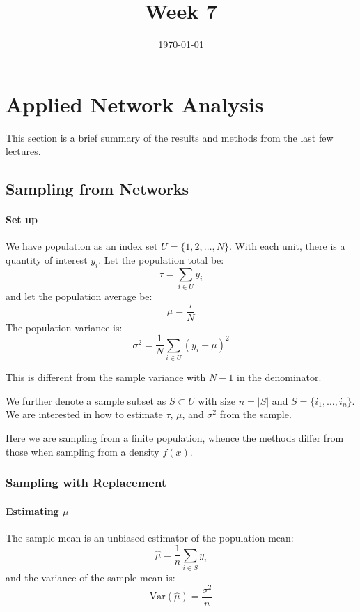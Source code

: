 \documentclass{article}
\title{Week 7}
\date{\today}
\begin{document}
\maketitle
\section{Applied Network Analysis}
This section is a brief summary of the results and methods from the last few lectures.

\subsection{Sampling from Networks}
\paragraph{Set up} We have population as an index set $U=\{1,2,\ldots, N\}$. With each unit, there is a quantity of interest $y_i$. Let the population total be:
\begin{equation}
    \tau = \sum_{i\in U} y_i
\end{equation}
and let the population average be:
\begin{equation}
    \mu = \frac{\tau}{N}
\end{equation}
The population variance is:
\begin{equation}
    \sigma^2 = \frac{1}{N}\sum_{i\in U} (y_i-\mu)^2
\end{equation}

\begin{remark}
    This is different from the sample variance with $N-1$ in the denominator.
\end{remark}

We further denote a sample subset as $S\subset U$ with size $n=|S|$ and $S=\{i_1, \ldots, i_n\}$. We are interested in how to estimate $\tau$,  $\mu$, and $\sigma^2$ from the sample.

\begin{remark}
    Here we are sampling from a finite population, whence the methods differ from those when sampling from a density $f(x)$.
\end{remark}

\subsubsection{Sampling with Replacement}

\paragraph{Estimating $\mu$} The sample mean is an unbiased estimator of the population mean: 
\begin{equation}
    \hat{\mu} = \frac{1}{n}\sum_{i\in S} y_i
\end{equation}
and the variance of the sample mean is:
\begin{equation}\label{eq:var_sample_mean}
    \mathrm{Var}(\hat{\mu}) = \frac{\sigma^2}{n}
\end{equation}
\end{document}
